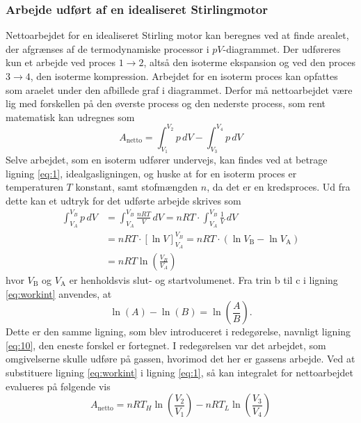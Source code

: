\documentclass[SRC.tex]{subfiles}
\begin{document}
	\subsubsection{Arbejde udført af en idealiseret Stirlingmotor}
	Nettoarbejdet for en idealiseret Stirling motor kan beregnes ved at finde arealet, der afgrænses
	af de termodynamiske processor  i \(pV\)-diagrammet. Der udføreres kun et arbejde ved 
	proces \(1\rightarrow2\), altså den isoterme ekspansion og ved den proces \(3 \rightarrow 4\), 
	den isoterme kompression. Arbejdet for en isoterm proces kan opfattes som araelet under den 
	afbillede graf i diagrammet. Derfor må nettoarbejdet være lig med forskellen på den øverste
	process og den nederste process, som rent matematisk kan udregnes som
	\begin{equation}
		A_{\text{netto}} = \int_{V_1}^{V_2} p \, dV - \int_{V_3}^{V_4} p \, dV 
		\label{eq:1}
	\end{equation}
	Selve arbejdet, som en isoterm udfører undervejs, kan findes ved at betrage ligning \eqref{eq:1},
	idealgasligningen, og huske at for en isoterm proces er temperaturen \(T\) konstant, samt stofmængden \(n\), da det er en kredsproces. Ud fra dette kan et udtryk for det udførte arbejde skrives som
	\begin{subequations}
		\begin{align}
		\int_{V_A}^{V_B} p \, dV &= \int_{V_A}^{V_B} \frac{nRT}{V} \, dV  = nRT \cdot 	\int_{V_A}^{V_B} \frac{1}{V}\, dV \\
		&= nRT \cdot \left[\ln V\right]_{V_A}^{V_B}  = nRT \cdot (\ln V_\text{B} - \ln V_\text{A})\\
		&=nRT \ln\left(\frac{V_B}{V_A}\right)
		\label{eq:workint}
		\end{align}
	\end{subequations}
	hvor \(V_{\text{B}}\) og \(V_{\text{A}}\) er henholdsvis slut- og startvolumenet. Fra trin b til c
	i ligning \eqref{eq:workint} anvendes, at \[\ln(A)-\ln(B) = \ln\left(\frac{A}{B}\right). \]
	Dette er den samme ligning, som blev introduceret i redegørelse, navnligt ligning \eqref{eq:10},
	den eneste forskel er fortegnet. I redegørelsen var det arbejdet, som omgivelserne skulle udføre
	på gassen, hvorimod det her er gassens arbejde. 
	Ved at substituere ligning \eqref{eq:workint} i ligning \eqref{eq:1}, så kan integralet for 
	nettoarbejdet evalueres på følgende vis
	\begin{equation}
		A_{\text{netto}} = nRT_H\ln\left(\frac{V_2}{V_1}\right)-nRT_L\ln\left(\frac{V_3}{V_4}\right)
	\end{equation}
\end{document}
